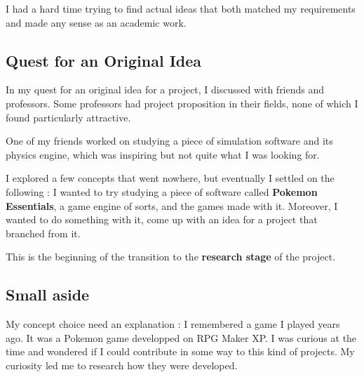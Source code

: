 \documentclass[11pt]{article}
\begin{document}
I had a hard time trying to find actual ideas that both matched my requirements and made any sense as an academic work.


\subsection{Quest for an Original Idea}

In my quest for an original idea for a project, I discussed with friends and professors. Some professors had project proposition in their fields, none of which I found particularly attractive.

One of my friends worked on studying a piece of simulation software and its physics engine, which was inspiring but not quite what I was looking for.

I explored a few concepts that went nowhere, but eventually I settled on the following : I wanted to try studying a piece of software called \textbf{Pokemon Essentials}, a game engine of sorts, and the games made with it. Moreover, I wanted to do something with it, come up with an idea for a project that branched from it.

This is the beginning of the transition to the \textbf{research stage} of the project.

\newpage
\subsection{Small aside}

My concept choice need an explanation : I remembered a game I played years ago. It was a Pokemon game developped on RPG Maker XP. I was curious at the time and wondered if I could contribute in some way to this kind of projects. My curiosity led me to research how they were developed.
\end{document}

